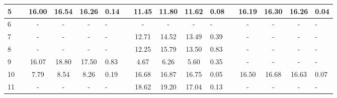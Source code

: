 \begin{table}
\begin{tabular}{>{\centering}p{0.2cm}cccc>{\centering}p{0.75cm}cccc>{\centering}p{0.75cm}cccc>{\centering}p{0.75cm}}
\cline{1-6} \cline{8-11} \cline{13-16} 
{\scriptsize{5}} &  & {\scriptsize{16.00}} & {\scriptsize{16.54}} & {\scriptsize{16.26}} & {\scriptsize{0.14}} &  & {\scriptsize{11.45}} & {\scriptsize{11.80}} & {\scriptsize{11.62}} & {\scriptsize{0.08}} &  & {\scriptsize{16.19}} & {\scriptsize{16.30}} & {\scriptsize{16.26}} & {\scriptsize{0.04}}\tabularnewline
\cline{1-6} \cline{8-11} \cline{13-16} 
{\scriptsize{6}} &  & {\scriptsize{-}} & {\scriptsize{-}} & {\scriptsize{-}} & {\scriptsize{-}} &  & {\scriptsize{-}} & {\scriptsize{-}} & {\scriptsize{-}} & {\scriptsize{-}} &  & {\scriptsize{-}} & {\scriptsize{-}} & {\scriptsize{-}} & {\scriptsize{-}}\tabularnewline
\cline{1-6} \cline{8-11} \cline{13-16} 
{\scriptsize{7}} &  & {\scriptsize{-}} & {\scriptsize{-}} & {\scriptsize{-}} & {\scriptsize{-}} &  & {\scriptsize{12.71}} & {\scriptsize{14.52}} & {\scriptsize{13.49}} & {\scriptsize{0.39}} &  & {\scriptsize{-}} & {\scriptsize{-}} & {\scriptsize{-}} & {\scriptsize{-}}\tabularnewline
\cline{1-6} \cline{8-11} \cline{13-16} 
{\scriptsize{8}} &  & {\scriptsize{-}} & {\scriptsize{-}} & {\scriptsize{-}} & {\scriptsize{-}} &  & {\scriptsize{12.25}} & {\scriptsize{15.79}} & {\scriptsize{13.50}} & {\scriptsize{0.83}} &  & {\scriptsize{-}} & {\scriptsize{-}} & {\scriptsize{-}} & {\scriptsize{-}}\tabularnewline
\cline{1-6} \cline{8-11} \cline{13-16} 
{\scriptsize{9}} &  & {\scriptsize{16.07}} & {\scriptsize{18.80}} & {\scriptsize{17.50}} & {\scriptsize{0.83}} &  & {\scriptsize{4.67}} & {\scriptsize{6.26}} & {\scriptsize{5.60}} & {\scriptsize{0.35}} &  & {\scriptsize{-}} & {\scriptsize{-}} & {\scriptsize{-}} & {\scriptsize{-}}\tabularnewline
\cline{1-6} \cline{8-11} \cline{13-16} 
{\scriptsize{10}} &  & {\scriptsize{7.79}} & {\scriptsize{8.54}} & {\scriptsize{8.26}} & {\scriptsize{0.19}} &  & {\scriptsize{16.68}} & {\scriptsize{16.87}} & {\scriptsize{16.75}} & {\scriptsize{0.05}} &  & {\scriptsize{16.50}} & {\scriptsize{16.68}} & {\scriptsize{16.63}} & {\scriptsize{0.07}}\tabularnewline
\cline{1-6} \cline{8-11} \cline{13-16} 
{\scriptsize{11}} &  & {\scriptsize{-}} & {\scriptsize{-}} & {\scriptsize{-}} & {\scriptsize{-}} &  & {\scriptsize{18.62}} & {\scriptsize{19.20}} & {\scriptsize{17.04}} & {\scriptsize{0.13}} &  & {\scriptsize{-}} & {\scriptsize{-}} & {\scriptsize{-}} & {\scriptsize{-}}\tabularnewline
\hline 
\end{tabular}
\end{table}


